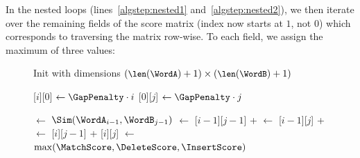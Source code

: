 In the nested loops (lines~\ref{algstep:nested1} and~\ref{algstep:nested2}), we then iterate over the remaining fields of the score matrix (index now starts at $1$, not $0$) which corresponds to traversing the matrix row-wise. To each field, we assign the maximum of three values:


\begin{figure}

\begin{minipage}[t]{0.6\textwidth}

\begin{algorithm}[H]
    \DontPrintSemicolon
    
    \newcommand{\ScoreMatrixIdx}[2]{{\ScoreMatrix}[{#1}][{#2}]}

    \KwOut{\Score}
    \Fn{\calcScoreFunc{}}
    {
        \SetInd{0.25em}{0.55em}
        Init \ScoreMatrix with dimensions $\small{(\len(\WordA)+1) \times (\len(\WordB)+1)}$\;

        \BlankLine

        {
            \ScoreMatrixIdx{$i$}{$0$} $\gets \GapPenalty \cdot i$\;
        }
        {
            \ScoreMatrixIdx{$0$}{$j$} $\gets \GapPenalty \cdot j$
            \label{algstep:init-gap-end}\;
        }

        \BlankLine

        {
            {
                \Cost $\gets$ $\Sim(\WordA_{i-1}, \WordB_{j-1})$
                \label{algstep:sim}\;
                \MatchScore $\gets$ \ScoreMatrixIdx{$i-1$}{$j-1$} + \Cost
                \label{algstep:matchscore}\;
                \DeleteScore $\gets$ \ScoreMatrixIdx{$i-1$}{$j$} + \GapPenalty
                \label{algstep:deletescore}\;
                \InsertScore $\gets$ \ScoreMatrixIdx{$i$}{$j-1$} + \GapPenalty
                \label{algstep:insertscore}\;
                \ScoreMatrixIdx{$i$}{$j$} $\gets$
                $\max(\MatchScore, \DeleteScore, \InsertScore)$
                \label{algstep:max}\;
            }
        }

}
\end{algorithm}
\end{minipage}
\end{figure}
